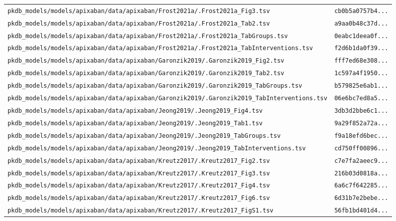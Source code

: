 \begin{longtable}{ll}
\texttt{pkdb\_models/models/apixaban/data/apixaban/Frost2021a/.Frost2021a\_Fig3.tsv} & \texttt{cb0b5a0757b4...} \\
\texttt{pkdb\_models/models/apixaban/data/apixaban/Frost2021a/.Frost2021a\_Tab2.tsv} & \texttt{a9aa0b48c37d...} \\
\texttt{pkdb\_models/models/apixaban/data/apixaban/Frost2021a/.Frost2021a\_TabGroups.tsv} & \texttt{0eabc1deea0f...} \\
\texttt{pkdb\_models/models/apixaban/data/apixaban/Frost2021a/.Frost2021a\_TabInterventions.tsv} & \texttt{f2d6b1da0f39...} \\
\texttt{pkdb\_models/models/apixaban/data/apixaban/Garonzik2019/.Garonzik2019\_Fig2.tsv} & \texttt{fff7ed68e308...} \\
\texttt{pkdb\_models/models/apixaban/data/apixaban/Garonzik2019/.Garonzik2019\_Tab2.tsv} & \texttt{1c597a4f1950...} \\
\texttt{pkdb\_models/models/apixaban/data/apixaban/Garonzik2019/.Garonzik2019\_TabGroups.tsv} & \texttt{b579825e6ab1...} \\
\texttt{pkdb\_models/models/apixaban/data/apixaban/Garonzik2019/.Garonzik2019\_TabInterventions.tsv} & \texttt{06e6bc7ed8a5...} \\
\texttt{pkdb\_models/models/apixaban/data/apixaban/Jeong2019/.Jeong2019\_Fig4.tsv} & \texttt{3db3d2bbe6c1...} \\
\texttt{pkdb\_models/models/apixaban/data/apixaban/Jeong2019/.Jeong2019\_Tab1.tsv} & \texttt{9a29f852a72a...} \\
\texttt{pkdb\_models/models/apixaban/data/apixaban/Jeong2019/.Jeong2019\_TabGroups.tsv} & \texttt{f9a18efd6bec...} \\
\texttt{pkdb\_models/models/apixaban/data/apixaban/Jeong2019/.Jeong2019\_TabInterventions.tsv} & \texttt{cd750ff00896...} \\
\texttt{pkdb\_models/models/apixaban/data/apixaban/Kreutz2017/.Kreutz2017\_Fig2.tsv} & \texttt{c7e7fa2aeec9...} \\
\texttt{pkdb\_models/models/apixaban/data/apixaban/Kreutz2017/.Kreutz2017\_Fig3.tsv} & \texttt{216b03d0818a...} \\
\texttt{pkdb\_models/models/apixaban/data/apixaban/Kreutz2017/.Kreutz2017\_Fig4.tsv} & \texttt{6a6c7f642285...} \\
\texttt{pkdb\_models/models/apixaban/data/apixaban/Kreutz2017/.Kreutz2017\_Fig6.tsv} & \texttt{6d31b7e2bebe...} \\
\texttt{pkdb\_models/models/apixaban/data/apixaban/Kreutz2017/.Kreutz2017\_FigS1.tsv} & \texttt{56fb1bd401d4...} \\

\end{longtable}
